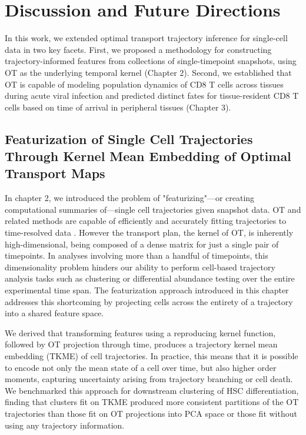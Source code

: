 
\chapter{Discussion and Future Directions}

In this work, we extended optimal transport trajectory inference for single-cell data in two key facets. First, we proposed a methodology for constructing trajectory-informed features from collections of single-timepoint snapshots, using OT as the underlying temporal kernel (Chapter 2). Second, we established that OT is capable of modeling population dynamics of CD8 T cells across tissues during acute viral infection and predicted distinct fates for tissue-resident CD8 T cells based on time of arrival in peripheral tissues (Chapter 3).

\section{Featurization of Single Cell Trajectories Through Kernel Mean Embedding of Optimal Transport Maps}

In chapter 2, we introduced the problem of "featurizing"---or creating computational summaries of---single cell trajectories given snapshot data. OT and related methods are capable of efficiently and accurately fitting trajectories to time-resolved data \citep{schiebingerOptimalTransportAnalysisSingleCell2019, kleinMappingCellsTime2025, kleinCellFlowEnablesGenerative2025}. However the transport plan, the kernel of OT, is inherently high-dimensional, being composed of a dense matrix for just a single pair of timepoints. In analyses involving more than a handful of timepoints, this dimensionality problem hinders our ability to perform cell-based trajectory analysis tasks such as clustering or differential abundance testing over the entire experimental time span. The featurization approach introduced in this chapter addresses this shortcoming by projecting cells across the entirety of a trajectory into a shared feature space.

We derived that transforming features using a reproducing kernel function, followed by OT projection through time, produces a trajectory kernel mean embedding (TKME) of cell trajectories. In practice, this means that it is possible to encode not only the mean state of a cell over time, but also higher order moments, capturing uncertainty arising from trajectory branching or cell death. We benchmarked this approach for downstream clustering of HSC differentiation, finding that clusters fit on TKME produced more consistent partitions of the OT trajectories than those fit on OT projections into PCA space or those fit without using any trajectory information.

